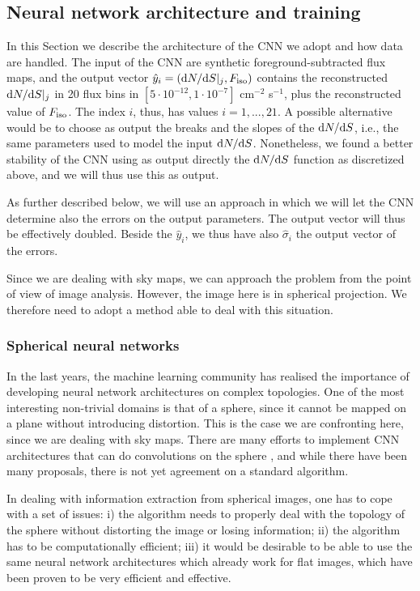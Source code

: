 \subsection{Neural network architecture and training}
\label{sec:architechture-and-training}

In this Section we describe the architecture of the CNN we adopt and how data are handled.
%
The input of the CNN are synthetic foreground-subtracted flux maps, and the output vector ${\hat y}_i = (\text{d}N/\text{d}S|_j, F_{\text{iso}})$ contains the reconstructed $\text{d}N/\text{d}S|_j$ in 20 flux bins in {$[5 \cdot 10^{-12}, 1 \cdot 10^{-7}]$} cm$^{-2}$ s$^{-1}$, plus the reconstructed value of $F_{\text{iso}}$. The index $i$, thus, has values $i=1,...,21$.
A possible alternative would be to choose as output
the breaks and the slopes of the $\text{d}N/\text{d}S$, i.e., the same parameters used to model the input $\text{d}N/\text{d}S$. Nonetheless, we found a better stability of the CNN using as output directly the $\text{d}N/\text{d}S$ function as discretized above, and we will thus use this as output. 

As further described below, we will use an approach in which we will let the CNN determine also the errors on the output parameters. The output vector will thus be effectively doubled. Beside the ${\hat y}_i$, we thus have also $\hat{\sigma}_i$ the output vector of the errors. 


Since we are dealing with sky maps, we can approach the problem from the point of view of image analysis. However, the image here is in spherical projection. We therefore need to adopt a method able to deal with this situation.


\subsubsection{Spherical neural networks}
In the last years, the machine learning community has realised the importance of developing neural network architectures on complex topologies. One of the most interesting non-trivial domains is that of a sphere, since it cannot be mapped on a plane without introducing distortion. This is the case we are confronting here, since we are dealing with sky maps.  There are many efforts to implement CNN architectures that can do convolutions on the sphere \cite{DBLP:journals/corr/abs-1708-00919,DBLP:journals/corr/abs-1902-04615,DBLP:journals/corr/abs-2012-15000,Krachmalnicoff:2019,mapped-convolutions}, and while there have been many proposals, there is not yet agreement on a standard algorithm.

In dealing with information extraction from spherical images, one has to cope with a set of issues: 
i) the algorithm needs to properly deal with the topology of the sphere without distorting the image or losing information;
ii) the algorithm has to be computationally efficient;
iii) it would be desirable to be able to use the same neural network architectures which already work for flat images, which have been proven to be very efficient and effective.

